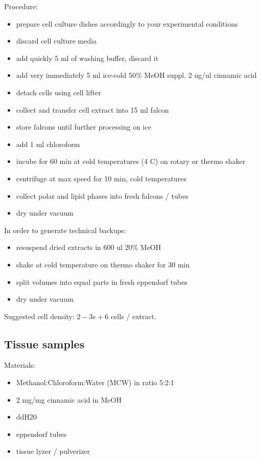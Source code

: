 \documentclass[]{book}
\providecommand{\tightlist}{%
  \setlength{\itemsep}{0pt}\setlength{\parskip}{0pt}}
\theoremstyle{definition}
\theoremstyle{definition}
\theoremstyle{definition}
\theoremstyle{remark}
\begin{document}
Procedure:

\begin{itemize}
\tightlist
\item
  prepare cell culture dishes accordingly to your experimental
  conditions
\item
  discard cell culture media
\item
  add quickly 5 ml of washing buffer, discard it
\item
  add very immediately 5 ml ice-cold 50\% MeOH suppl. 2 ug/ul cinnamic
  acid
\item
  detach cells using cell lifter
\item
  collect and transfer cell extract into 15 ml falcon
\item
  store falcons until further processing on ice
\item
  add 1 ml chloroform
\item
  incube for 60 min at cold temperatures (4 C) on rotary or thermo
  shaker
\item
  centrifuge at max speed for 10 min, cold temperatures
\item
  collect polar and lipid phases into fresh falcons / tubes
\item
  dry under vacuum
\end{itemize}

In order to generate technical backups:

\begin{itemize}
\tightlist
\item
  resuspend dried extracts in 600 ul 20\% MeOH
\item
  shake at cold temperature on thermo shaker for 30 min
\item
  split volumes into equal parts in fresh eppendorf tubes
\item
  dry under vacuum
\end{itemize}

Suggested cell density: \(2-3e+6\) cells / extract.

\subsection{Tissue samples}\label{tissue-samples}

Materials:

\begin{itemize}
\tightlist
\item
  Methanol:Chloroform:Water (MCW) in ratio 5:2:1
\item
  2 mg/mg cinnamic acid in MeOH
\item
  ddH20
\item
  eppendorf tubes
\item
  tissue lyzer / pulverizer
\end{itemize}
\end{document}
